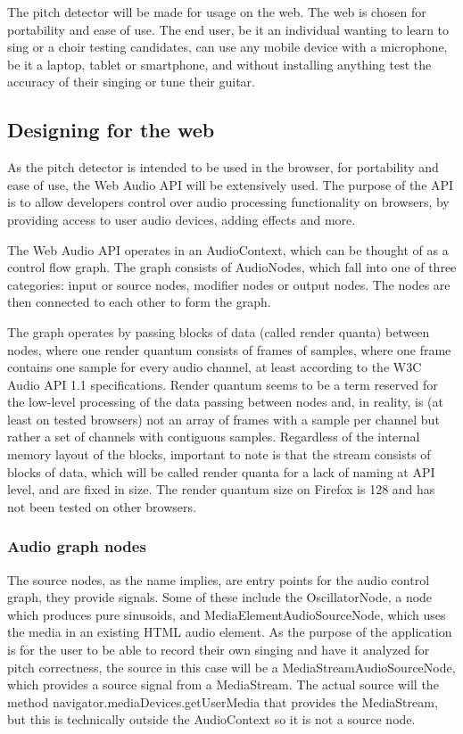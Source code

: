 The pitch detector will be made for usage on the web. The web is chosen for portability and ease of use. The end user, be it an individual wanting to learn to sing or a choir testing candidates, can use any mobile device with a microphone, be it a laptop, tablet or smartphone, and without installing anything test the accuracy of their singing or tune their guitar.

\subsection{Designing for the web}
As the pitch detector is intended to be used in the browser, for portability and ease of use, the Web Audio API will be extensively used. The purpose of the API is to allow developers control over audio processing functionality on browsers, by providing access to user audio devices, adding effects and more.  

The Web Audio API operates in an AudioContext, which can be thought of as a control flow graph. The graph consists of AudioNodes, which fall into one of three categories: input or source nodes, modifier nodes or output nodes. The nodes are then connected to each other to form the graph. 

The graph operates by passing blocks of data (called render quanta) between nodes, where one render quantum consists of frames of samples, where one frame contains one sample for every audio channel, at least according to the W3C Audio API 1.1 specifications. Render quantum seems to be a term reserved for the low-level processing of the data passing between nodes and, in reality, is (at least on tested browsers) not an array of frames with a sample per channel but rather a set of channels with contiguous samples. Regardless of the internal memory layout of the blocks, important to note is that the stream consists of blocks of data, which will be called render quanta for a lack of naming at API level, and are fixed in size. The render quantum size on Firefox is 128 and has not been tested on other browsers. 


\subsubsection{Audio graph nodes}
The source nodes, as the name implies, are entry points for the audio control graph, they provide signals. Some of these include the OscillatorNode, a node which produces pure sinusoids, and MediaElementAudioSourceNode, which uses the media in an existing HTML audio element. As the purpose of the application is for the user to be able to record their own singing and have it analyzed for pitch correctness, the source in this case will be a MediaStreamAudioSourceNode, which provides a source signal from a MediaStream. The actual source will the method navigator.mediaDevices.getUserMedia\(\) that provides the MediaStream, but this is technically outside the AudioContext so it is not a source node.

